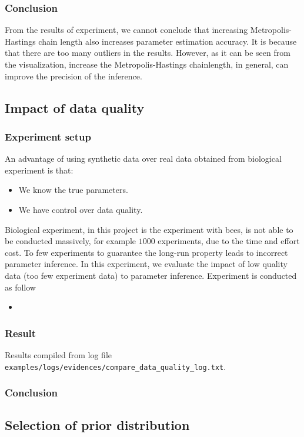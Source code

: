 \documentclass[12pt]{article}
\theoremstyle{definition}
\begin{document}
\subsubsection{Conclusion}
From the results of experiment, we cannot conclude that increasing
Metropolis-Hastings chain length also increases parameter estimation accuracy.
It is because that there are too many outliers in the results. However, as it
can be seen from the visualization, increase the Metropolis-Hastings
chainlength, in general, can improve the precision of the inference.

\subsection{Impact of data quality}
\subsubsection{Experiment setup}
An advantage of using synthetic data over real data obtained from biological
experiment is that:
\begin{itemize}
\item We know the true parameters.
\item We have control over data quality.
\end{itemize}
Biological experiment, in this project is the experiment with bees, is not able
to be conducted massively, for example $1000$ experiments, due to the time and
effort cost. To few experiments to guarantee the long-run property leads to
incorrect parameter inference. In this experiment, we evaluate the impact of
low quality data (too few experiment data) to parameter inference. 
Experiment is conducted as follow
\begin{itemize}
\item 
\end{itemize}
\subsubsection{Result}

Results compiled from log file \texttt{examples/logs/evidences/compare\_data\_quality\_log.txt}.\\
\subsubsection{Conclusion}

\subsection{Selection of prior distribution}
\end{document}
